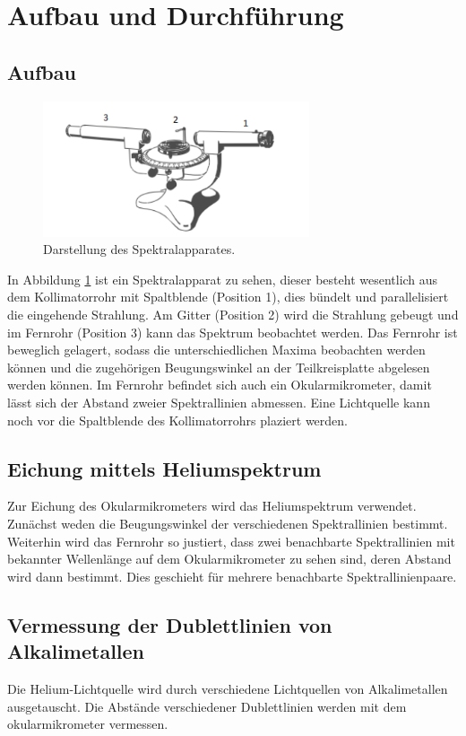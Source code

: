 \newpage
\section{Aufbau und Durchführung}
\label{sec:Durchführung}
\subsection{Aufbau}
\begin{figure}
 \centering
 \includegraphics[width=0.7\textwidth]{Aufbau.png}
 \caption{Darstellung des Spektralapparates.\cite{sample}}
 \label{fig:apparat}
 \end{figure}
In Abbildung \ref{fig:apparat} ist ein Spektralapparat zu sehen, dieser besteht wesentlich aus dem Kollimatorrohr mit Spaltblende (Position 1), dies bündelt und parallelisiert die eingehende Strahlung.
Am Gitter (Position 2) wird die Strahlung gebeugt und im Fernrohr (Position 3) kann das Spektrum beobachtet werden. Das Fernrohr ist beweglich gelagert, sodass die unterschiedlichen Maxima
beobachten werden können und die zugehörigen Beugungswinkel an der Teilkreisplatte abgelesen werden können. Im Fernrohr befindet sich auch ein Okularmikrometer, damit lässt sich der Abstand
zweier Spektrallinien abmessen.
Eine Lichtquelle kann noch vor die Spaltblende des Kollimatorrohrs plaziert werden.

\subsection{Eichung mittels Heliumspektrum}
Zur Eichung des Okularmikrometers wird das Heliumspektrum verwendet. Zunächst weden die Beugungswinkel der verschiedenen Spektrallinien bestimmt.
Weiterhin wird das Fernrohr so justiert, dass zwei benachbarte Spektrallinien mit bekannter Wellenlänge auf dem Okularmikrometer zu sehen sind, deren Abstand wird dann bestimmt.
Dies geschieht für mehrere benachbarte Spektrallinienpaare.

\subsection{Vermessung der Dublettlinien von Alkalimetallen}
Die Helium-Lichtquelle wird durch verschiedene Lichtquellen von Alkalimetallen ausgetauscht.
Die Abstände verschiedener Dublettlinien werden mit dem okularmikrometer vermessen.
